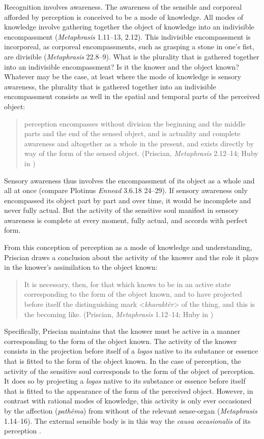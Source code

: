 \documentclass[12pt]{article}
\begin{document}
Recognition involves awareness. The awareness of the sensible and corporeal afforded by perception is conceived to be a mode of knowledge. All modes of knowledge involve gathering together the object of knowledge into an indivisible encompassment (\emph{Metaphrasis} 1.11--13, 2.12). This indivisible encompassment is incorporeal, as corporeal encompassments, such as grasping a stone in one's fist, are divisible (\emph{Metaphrasis} 22.8--9). What is the plurality that is gathered together into an indivisible encompassment? Is it the knower and the object known? Whatever may be the case, at least where the mode of knowledge is sensory awareness, the plurality that is gathered together into an indivisible encompassment consists as well in the spatial and temporal parts of the perceived object:
\begin{quote}
	perception encompasses without division the beginning and the middle parts and the end of the sensed object, and is actuality and complete awareness and altogether as a whole in the present, and exists directly by way of the form of the sensed object. (Priscian, \emph{Metaphrasis} 2.12--14; Huby in \citealt{Sorabji:1997ly})
\end{quote}
Sensory awareness thus involves the encompassment of its object as a whole and all at once (compare Plotinus \emph{Ennead} 3.6.18 24--29). If sensory awareness only encompassed its object part by part and over time, it would be incomplete and never fully actual. But the activity of the sensitive soul manifest in sensory awareness is complete at every moment, fully actual, and accords with perfect form.

From this conception of perception as a mode of knowledge and understanding, Priscian draws a conclusion about the activity of the knower and the role it plays in the knower's assimilation to the object known: 
\begin{quote}
	It is necessary, then, for that which knows to be in an active state corresponding to the form of the object known, and to have projected before itself the distinguishing mark <\emph{kharaktêr}> of the thing, and this is the becoming like. (Priscian, \emph{Metaphrasis} 1.12--14; Huby in \citealt[9]{Sorabji:1997ly})
\end{quote}
Specifically, Priscian maintains that the knower must be active in a manner corresponding to the form of the object known. The activity of the knower consists in the projection before itself of a \emph{logos} native to its substance or essence that is fitted to the form of the object known. In the case of perception, the activity of the sensitive soul corresponds to the form of the object of perception. It does so by projecting a \emph{logos} native to its substance or essence before itself that is fitted to the appearance of the form of the perceived object. However, in contrast with rational modes of knowledge, this activity is only ever occasioned by the affection (\emph{pathêma}) from without of the relevant sense-organ (\emph{Metaphrasis} 1.14--16). The external sensible body is in this way the \emph{causa occasionalis} of its perception \citep[112]{Lautner:1994cs}.
\end{document}
